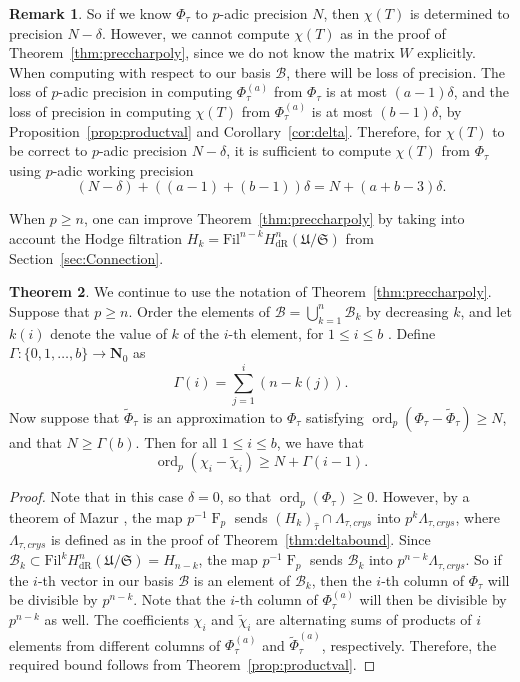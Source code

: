 \documentclass[a4paper,11pt]{article}
\numberwithin{equation}{section}
\newcommand{\NN}{\mathbf{N}} %
\DeclareMathOperator{\ord}{ord}          %
\DeclareMathOperator{\Frob}{F}           %
\providecommand{\HdR}{H_{\text{dR}}}    %
\providecommand{\cB}{\mathcal{B}} %
\theoremstyle{definition}
\newtheorem{thm}{Theorem}[section]
\newtheorem{rem}[thm]{Remark}
\begin{document}
\begin{rem} \label{rem:workprecchi}
So if we know $\Phi_{\tau}$ to $p$-adic precision $N$, then
$\chi(T)$ is determined to precision $N-\delta$.
However, we cannot compute $\chi(T)$ as in the proof of 
Theorem~\ref{thm:preccharpoly}, since we do not know the matrix 
$W$ explicitly. When computing with respect to our basis $\cB$,
there will be loss of precision. The loss of $p$-adic precision 
in computing $\Phi_{\tau}^{(a)}$ from $\Phi_{\tau}$ is at most 
$(a-1)\delta$, and the loss of 
precision in computing $\chi(T)$ from $\Phi_{\tau}^{(a)}$ 
is at most $(b-1) \delta$, by Proposition~\ref{prop:productval} and 
Corollary~\ref{cor:delta}. Therefore, for $\chi(T)$ to be correct
to $p$-adic precision $N-\delta$, it is sufficient to compute 
$\chi(T)$ from $\Phi_{\tau}$ using $p$-adic working precision 
\[
(N-\delta)+((a-1)+(b-1))\delta=N+(a+b-3)\delta.
\] 
\end{rem}

When $p \geq n$, one can improve Theorem~\ref{thm:preccharpoly} by taking into 
account the Hodge filtration $H_k=\mbox{Fil}^{n-k} \HdR^{n}(\mathfrak{U}/\mathfrak{S})$ 
from Section~\ref{sec:Connection}.

\begin{thm} \label{thm:pgeqn}
We continue to use the notation of Theorem~\ref{thm:preccharpoly}. Suppose that $p \geq n$. 
Order the elements of $\cB = \bigcup_{k=1}^n \cB_k$ by decreasing $k$, and let $k(i)$ 
denote the value of $k$ of the $i$-th element, for $1 \leq i \leq b$ . Define 
$\Gamma: \{0,1, \dotsc, b\} \rightarrow \NN_0$ as
\[
\Gamma(i) = \sum_{j=1}^{i} (n-k(j)).
\]
Now suppose that $\tilde{\Phi}_{\tau}$ is an approximation to $\Phi_{\tau}$ 
satisfying $\ord_p (\Phi_{\tau}-\tilde{\Phi}_{\tau}) \geq N$, and that 
$N \geq \Gamma(b)$. Then for all $1 \leq i \leq b$, we have that 
\[
\ord_p(\chi_i-\tilde{\chi}_i) \geq N + \Gamma(i-1).
\]
\end{thm}
 
\begin{proof} 
Note that in this case $\delta=0$, so that $\ord_p(\Phi_{\tau}) \geq 0$. 
However, by a theorem of Mazur \citep{Mazur1972}, the map $p^{-1} \Frob_p$ 
sends $(H_k)_{\hat{\tau}} \cap \Lambda_{\tau,crys}$ into $p^k \Lambda_{\tau,crys}$, 
where $\Lambda_{\tau,crys}$ is defined as in the proof of 
Theorem~\ref{thm:deltabound}. Since 
$\cB_k \subset \mbox{Fil}^{k} \HdR^{n}(\mathfrak{U}/\mathfrak{S}) = H_{n-k}$, 
the map $p^{-1} \Frob_p$ sends $\cB_k$ into $p^{n-k} \Lambda_{\tau,crys}$. 
So if the $i$-th vector in our basis $\cB$ is an element of $\cB_k$, then 
the $i$-th column of $\Phi_{\tau}$ will be divisible by $p^{n-k}$. Note that 
the $i$-th column of $\Phi_{\tau}^{(a)}$ will then be divisible by $p^{n-k}$ 
as well. The coefficients $\chi_i$ and $\tilde{\chi}_i$ are alternating sums 
of products of $i$ elements from different columns of $\Phi_{\tau}^{(a)}$ 
and $\tilde{\Phi}_{\tau}^{(a)}$, respectively.  Therefore, the required bound 
follows from Theorem~\ref{prop:productval}. 
\end{proof}
\end{document}
